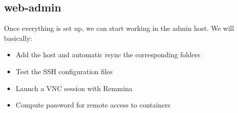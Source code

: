 
\subsection{web-admin}

Once everything is set up, we can start working in the admin host. We will basically:
\begin{itemize}
	\item{Add the host and automatic rsync the corresponding folders}
	\item{Test the SSH configuration files}
	\item{Launch a VNC session with Remmina}
	\item{Compute password for remote access to containers}
\end{itemize}






